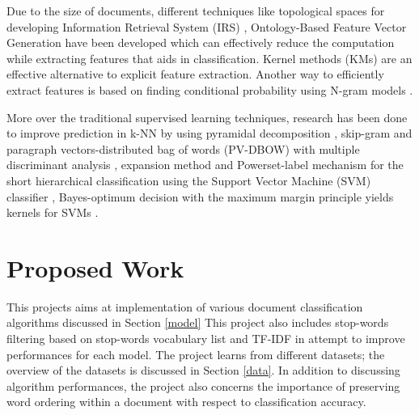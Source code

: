\documentclass[10pt,twocolumn,letterpaper]{article}
\begin{document}
Due to the size of documents, different techniques like topological spaces for developing Information Retrieval System (IRS) \cite{parlak2018feature},  Ontology-Based Feature Vector Generation \cite{elhadad2018novel} have been developed which can effectively reduce the computation while extracting features that aids in classification. Kernel methods (KMs) are an effective alternative to explicit feature extraction. Another way to efficiently extract features is based on finding conditional probability using N-gram models \cite{furnkranz1998study} .

More over the traditional supervised learning techniques, research has been done to improve prediction in k-NN by using pyramidal decomposition \cite{heroux1998classification},  skip-gram and paragraph vectors-distributed bag of words (PV-DBOW) with multiple discriminant analysis \cite{lauren2018discriminant}, expansion method and Powerset-label mechanism for the short hierarchical classification using the Support Vector Machine (SVM) classifier \cite{salih2018term}, Bayes-optimum decision with the maximum margin principle yields kernels for SVMs \cite{ding2014sensing}.

\section{Proposed Work}
This projects aims at implementation of various document classification algorithms discussed in Section \ref{model}
This project also includes stop-words filtering based on stop-words vocabulary list and TF-IDF in attempt to improve performances for each model. The project learns from different datasets; the overview of the datasets is discussed in Section \ref{data}. In addition to discussing algorithm performances, the project also concerns the importance of preserving word ordering within a document with respect to classification accuracy. 
\end{document}
